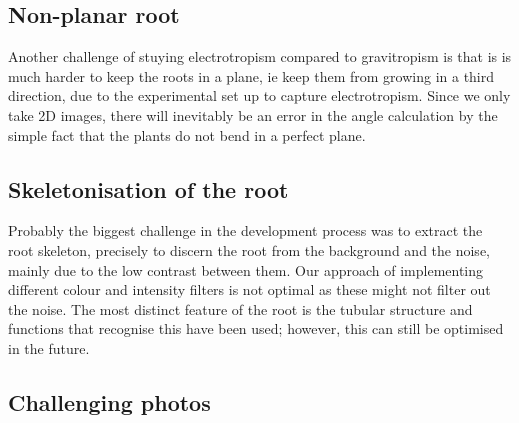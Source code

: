 \subsection{Non-planar root}

Another challenge of stuying electrotropism compared to gravitropism is that is is much harder to keep the roots in a plane, ie keep them from growing in a third direction, due to the experimental set up to capture electrotropism. Since we only take 2D images, there will inevitably be an error in the angle calculation by the simple fact that the plants do not bend in a perfect plane.


\subsection{Skeletonisation of the root}

Probably the biggest challenge in the development process was to extract the root skeleton, precisely to discern the root from the background and the noise, mainly due to the low contrast between them.
Our approach of implementing different colour and intensity filters is not optimal as these might not filter out the noise. 
The most distinct feature of the root is the tubular structure and functions that recognise this have been used; however, this can still be optimised in the future.



\subsection{Challenging photos}

